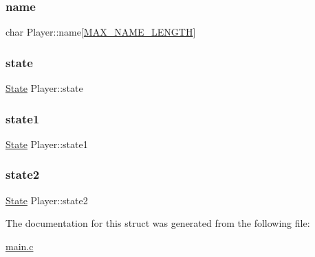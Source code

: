 \mbox{\label{structPlayer_a000f74f4241ebc344866c82bec4ed5ef}} 
\subsubsection{\texorpdfstring{name}{name}}
{\footnotesize\ttfamily char Player\+::name\mbox{[}\hyperlink{main_8c_a0c397a708cec89c74029582574516b30}{M\+A\+X\+\_\+\+N\+A\+M\+E\+\_\+\+L\+E\+N\+G\+TH}\mbox{]}}

\mbox{\label{structPlayer_ac4a623bf6650a719187c50bb0413b9a0}} 
\subsubsection{\texorpdfstring{state}{state}}
{\footnotesize\ttfamily \hyperlink{structState}{State} Player\+::state}

\mbox{\label{structPlayer_a7712ad6df23e875de18fb38537620909}} 
\subsubsection{\texorpdfstring{state1}{state1}}
{\footnotesize\ttfamily \hyperlink{structState}{State} Player\+::state1}

\mbox{\label{structPlayer_a7b894c51bb7a740af4a2ffef56a4e788}} 
\subsubsection{\texorpdfstring{state2}{state2}}
{\footnotesize\ttfamily \hyperlink{structState}{State} Player\+::state2}



The documentation for this struct was generated from the following file\+:\begin{DoxyCompactItemize}
\item 
\hyperlink{main_8c}{main.\+c}\end{DoxyCompactItemize}
